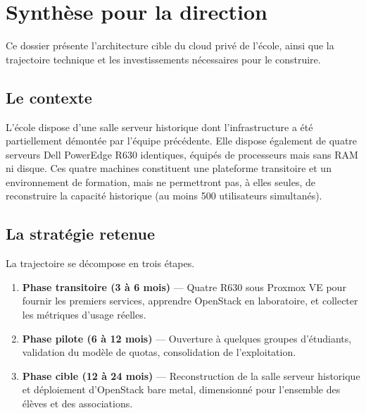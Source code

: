 \chapter*{Synthèse pour la direction}

Ce dossier présente l'architecture cible du cloud privé de l'école, ainsi que la trajectoire technique et les investissements nécessaires pour le construire.

\section*{Le contexte}
L'école dispose d'une salle serveur historique dont l'infrastructure a été partiellement démontée par l'équipe précédente. Elle dispose également de quatre serveurs Dell PowerEdge R630 identiques, équipés de processeurs mais sans RAM ni disque. Ces quatre machines constituent une plateforme transitoire et un environnement de formation, mais ne permettront pas, à elles seules, de reconstruire la capacité historique (au moins 500 utilisateurs simultanés).

\section*{La stratégie retenue}
La trajectoire se décompose en trois étapes.

\begin{enumerate}
  \item \textbf{Phase transitoire (3 à 6 mois)} — Quatre R630 sous Proxmox VE pour fournir les premiers services, apprendre OpenStack en laboratoire, et collecter les métriques d'usage réelles.
  \item \textbf{Phase pilote (6 à 12 mois)} — Ouverture à quelques groupes d'étudiants, validation du modèle de quotas, consolidation de l'exploitation.
  \item \textbf{Phase cible (12 à 24 mois)} — Reconstruction de la salle serveur historique et déploiement d'OpenStack bare metal, dimensionné pour l'ensemble des élèves et des associations.
\end{enumerate}

